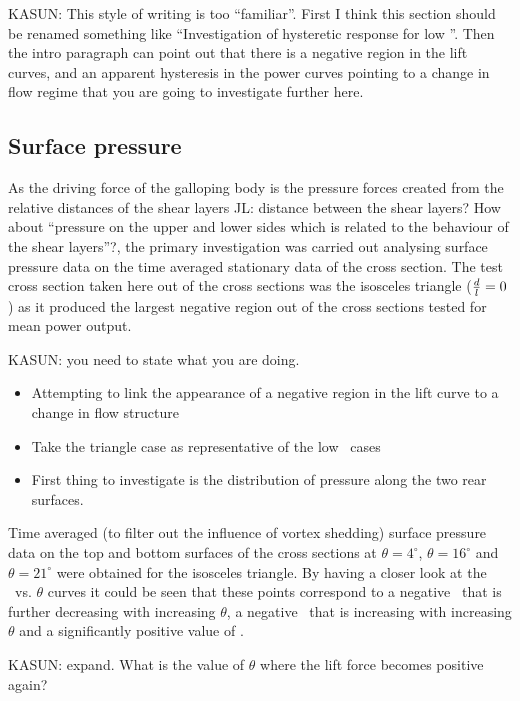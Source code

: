 KASUN: This style of writing is too ``familiar''. First I think this section should be renamed something like ``Investigation of hysteretic response for low \ratio''. Then the intro paragraph can point out that there is a negative region in the lift curves, and an apparent hysteresis in the power curves pointing to a change in flow regime that you are going to investigate further here.

\subsection{Surface pressure}
\label{subsec:cross-sec-surface pressure}

As the driving force of the galloping body is the pressure forces created from the relative distances of the shear layers JL: distance between the shear layers? How about ``pressure on the upper and lower sides which is related to the behaviour of the shear layers''?, the primary investigation was carried out analysing surface pressure data on the time averaged stationary data of the cross section. The test cross section taken here out of the cross sections was the isosceles triangle ($\frac{d}{l}=0$) as it produced the largest negative region out of the cross sections tested for mean power output. 

KASUN: you need to state what you are doing.
\begin{itemize}
\item Attempting to link the appearance of a negative region in the
  lift curve to a change in flow structure
\item Take the triangle case as representative of the low \ratio\
  cases
\item First thing to investigate is the distribution of pressure along
  the two rear surfaces.
\end{itemize}

Time averaged (to filter out the influence of vortex shedding) surface pressure data  on the top and bottom surfaces of the cross sections at $\theta=4^{\circ}$, $\theta=16^{\circ}$ and $\theta=21^{\circ}$ were obtained for the isosceles triangle. By having a closer look at the \cy\ vs. $\theta$ curves it could be seen that these points correspond to a negative \cy\ that is further decreasing with increasing $\theta$, a negative \cy\ that is increasing with increasing $\theta$ and a significantly positive value of \cy.

KASUN: expand. What is the value of $\theta$ where the lift force becomes positive again? 
 
